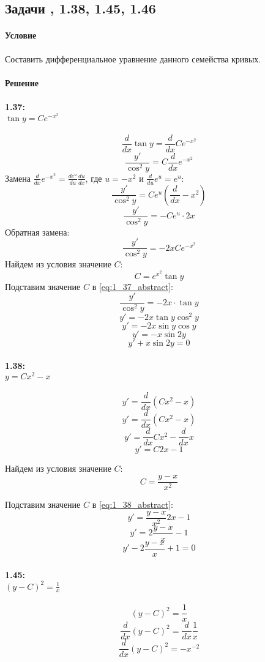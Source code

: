 \subsection{Задачи , 1.38, 1.45, 1.46}
\paragraph{Условие}
Составить дифференциальное уравнение данного семейства кривых.
\paragraph{Решение}
\paragraph{1.37:\\ $\tan y = Ce^{-x^2}$}
\[\frac{d}{dx}\tan y = \frac{d}{dx}Ce^{-x^2}\]
\[\frac{y'}{\cos^2 y} = C\frac{d}{dx}e^{-x^2}\]
Замена $\frac{d}{dx}e^{-x^2} = \frac{de^u}{du}\frac{du}{dx}$, где $u = -x^2$ и $\frac{d}{du}e^u = e^u$:
\[\frac{y'}{\cos^2 y} = Ce^u(\frac{d}{dx}-x^2)\]
\[\frac{y'}{\cos^2 y} = -Ce^u \cdot 2x\]
Обратная замена:
\begin{equation}
  \frac{y'}{\cos^2 y} = -2xCe^{-x^2}
  \label{eq:1_37_abstract}
\end{equation}
Найдем из условия значение $C$:
\[C = e^{x^2}\tan y\]
Подставим значение $C$ в \ref{eq:1_37_abstract}:
\[\frac{y'}{\cos^2 y} = -2x \cdot \tan y\]
\[y' = -2x \tan y \cos^2 y\]
\[y' = -2x \sin y\cos y\]
\[y' = -x  \sin 2y\]
\[y' + x  \sin 2y = 0\]

\paragraph{1.38:\\ $y = Cx^2 - x$}
\[y' = \frac{d}{dx}(Cx^2 - x)\]
\[y' = \frac{d}{dx}(Cx^2 - x)\]
\[y' = \frac{d}{dx}Cx^2 - \frac{d}{dx}x\]
\begin{equation}
  y' = C2x - 1
  \label{eq:1_38_abstract}
\end{equation}

Найдем из условия значение $C$:
\[C = \frac{y - x}{x^2}\]

Подставим значение $C$ в \ref{eq:1_38_abstract}:
\[y' = \frac{y-x}{x^2}2x - 1\]
\[y' = 2\frac{y-x}{x} - 1\]
\[y' - 2\frac{y-x}{x} + 1 = 0\]

\paragraph{1.45:\\ $(y - C)^2 = \frac{1}{x}$}
\[(y - C)^2 = \frac{1}{x}\]
\[\frac{d}{dx}(y - C)^2 = \frac{d}{dx}\frac{1}{x}\]
\[\frac{d}{dx}(y - C)^2 = -x^{-2}\]

